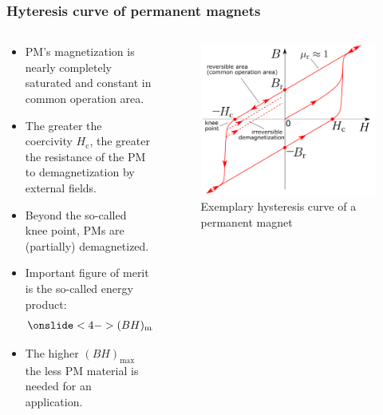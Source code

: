 \begin{frame}
	\frametitle{Hyteresis curve of permanent magnets}
	\begin{columns}
		\begin{column}{0.45\textwidth}
            \begin{itemize}
                \item PM's magnetization is nearly  completely saturated and constant in common operation area.
                \item<2-> The greater the coercivity $H_\mathrm{c}$, the greater the resistance of the PM to demagnetization by external fields.
                \item<3-> Beyond the so-called knee point, PMs are (partially) demagnetized.
                \item<4-> Important figure of merit is the so-called energy product:
                \begin{align}
                    \onslide<4->{(BH)_{\max} = \max \left\{- B H \right\}.}
                \end{align}
                \item<5-> The higher $(BH)_{\max}$ the less PM material is needed for an application.
            \end{itemize}
		\end{column}
        \hfill
		\begin{column}{0.42\textwidth}
            \vspace{-0.2cm}
			\begin{figure}
				\centering
				\includegraphics[height=0.6\textheight]{fig/lec02/Hyteresis_curve_PM.pdf}
				\caption{Exemplary hysteresis curve of a permanent magnet}
			\end{figure}
		\end{column}
		\end{columns}
\end{frame}

